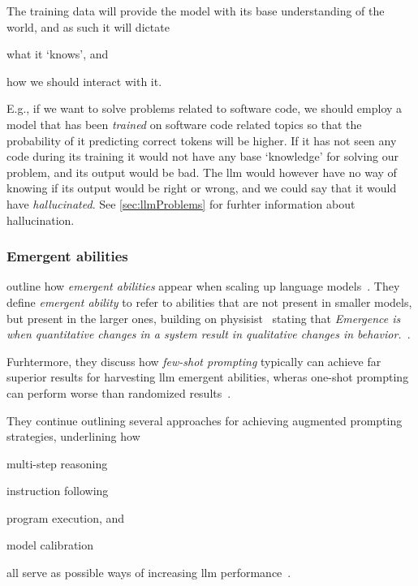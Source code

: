 The training data will provide the model with its base understanding of the
world, and as such it will dictate \begin{inparaenum}
    \item what it `knows', and
    \item how we should interact with it.
\end{inparaenum}
E.g., if we want to solve problems related to software code, we should employ a
model that has been \textit{trained} on software code related topics so that the
probability of it predicting correct tokens will be higher. If it has not seen
any code during its training it would not have any base `knowledge' for solving
our problem, and its output would be bad. The \acrshort{llm} would however have
no way of knowing if its output would be right or wrong, and we could say that
it would have \textit{hallucinated}.
See \cref{sec:llmProblems} for furhter information
about hallucination.


\subsubsection{Emergent abilities}\label{sec:emergentAbilities}

\citeauthor{emergentabilitiesLLM} outline how \textit{emergent abilities} appear
when scaling up language models~\cite[1]{emergentabilitiesLLM}. They define
\textit{emergent ability} to refer to abilities that are not present in smaller
models, but present in the larger ones\cite[1]{emergentabilitiesLLM}, building
on physisist~\citeauthor{anderson1972more} stating that \textit{Emergence is
    when quantitative changes in a system result in qualitative changes in
    behavior.}~\cite[2]{emergentabilitiesLLM}.

Furhtermore, they discuss how \textit{few-shot prompting} typically can achieve
far superior results for harvesting \acrshort{llm} emergent abilities, wheras
one-shot prompting can perform worse than randomized
results~\cite[3-4]{emergentabilitiesLLM}.

They continue outlining several approaches for achieving augmented prompting
strategies, underlining how \begin{inparaenum}
    \item multi-step reasoning
    \item instruction following
    \item program execution,
    and
    \item model calibration
\end{inparaenum}
all serve as possible ways of increasing \acrshort{llm} performance~\cite[5]{emergentabilitiesLLM}.

